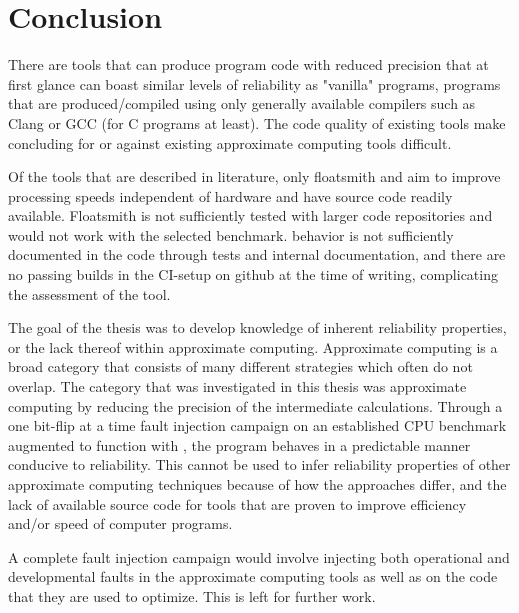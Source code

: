 \section{Conclusion}

There are tools that can produce program code with reduced precision that at first glance can boast similar levels of reliability as "vanilla" programs, programs that are produced/compiled using only generally available compilers such as Clang or GCC (for C programs at least). 
The code quality of existing tools make concluding for or against existing approximate computing tools difficult. 

Of the tools that are described in literature, only floatsmith and \taffo{} aim to improve processing speeds independent of hardware and have source code readily available. Floatsmith is not sufficiently tested with larger code repositories and would not work with the selected benchmark.\taffo{} behavior is not sufficiently documented in the code through tests and internal documentation, and there are no passing builds in the CI-setup on github at the time of writing, complicating the assessment of the tool.

The goal of the thesis was to develop knowledge of inherent reliability properties, or the lack thereof within approximate computing. Approximate computing is a broad category that consists of many different strategies which often do not overlap. The category that was investigated in this thesis was approximate computing by reducing the precision of the intermediate calculations. Through a one bit-flip at a time fault injection campaign on an established CPU benchmark augmented to function with \taffo{}, the program behaves in a predictable manner conducive to reliability. This cannot be used to infer reliability properties of other approximate computing techniques because of how the approaches differ, and the lack of available source code for  tools that are proven to improve efficiency and/or speed of computer programs. 

A complete fault injection campaign would involve injecting both operational and developmental faults in the approximate computing tools as well as on the code that they are used to optimize. This is left for further work. 